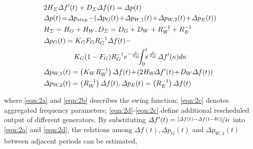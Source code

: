 \documentclass[lettersize,journal]{IEEEtran}
\begin{document}
\vspace{-0.125in}
\begin{newsubequations}\label{eqn:2}
	\begin{align}
		 & 2H_{\varSigma } \varDelta f^{\prime}(t)  +D_{\varSigma} \varDelta f(t)=\varDelta p(t)  \label{eqn:2a}                                                                  \\
		 & \varDelta p(t) \! =\!\varDelta p_{step}\!-\!\left(\varDelta p_{G}(t)\!+\!\varDelta p_{W,1}(t)\!+\!\varDelta p_{W,2}(t)\!+\! \varDelta p_{E}(t)\right) \!\label{eqn:2b} \\
		 & H_{\varSigma}  =H_{G}+H_{W}, D_{\varSigma}  =D_{G}+D_{W}+{ R_{W}^{-1} } + { R_{E}^{-1}}   \label{eqn:2c}                                                               \\
		 & \varDelta p_{G}(t)   ={K_{G} F_{G}}{ R_{G}^{-1}} \varDelta f(t)- \notag                                                                                                \\
		 & \qquad\quad\quad\,\, {K_G(1-F_G)}{ R_{G}^{-1} }e^{-\frac{t}{T_G}} \!\!\!\int_{0}^{t}\!\!\! e^{\frac{\kappa}{T_G}} \varDelta f^{\prime}(\kappa) d \kappa \label{eqn:2d} \\
		 & \varDelta p_{W,1}(t) =\left(K_{W} {R_{W}^{-1}}\right) \varDelta f(t) \!+\! \left(2H_{W}\! \varDelta f^{\prime}(t) \!+\! D_{W}\varDelta f(t)\right)\label{eqn:2e}       \\
		 & \varDelta p_{W,2}(t)  =\left( { R_{W}^{-1}}\right) \varDelta f(t), \varDelta p_{E}(t)  =\left( { R_{E}^{-1}}\right) \varDelta f(t) \label{eqn:2g}
	\end{align}
\end{newsubequations}


\noindent where \eqref{eqn:2a} and \eqref{eqn:2b} describes the swing function; \eqref{eqn:2c} denotes aggregated frequency parameters; \eqref{eqn:2d}-\eqref{eqn:2c} define additional rescheduled output of different generators.  By substituting $\varDelta f^{\prime}(t) = \nicefrac{[\varDelta f(t)-\varDelta f(t-\delta t)]}{ \delta t}$ into \eqref{eqn:2a} and \eqref{eqn:2d}, the relations among $\varDelta f(t), \varDelta p_{G}(t)$ and $\varDelta p_{W,1}(t)$ between adjacent periods can be estimated,
\end{document}
